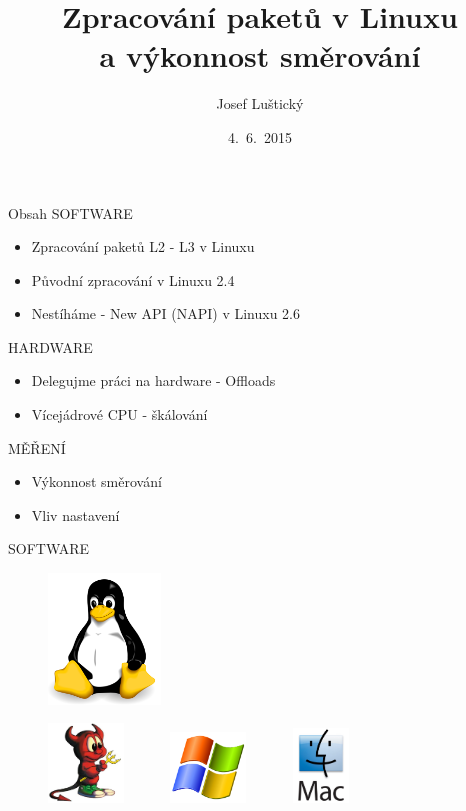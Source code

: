 \documentclass{beamer}
\title{Zpracování paketů v Linuxu\\ a výkonnost směrování}
\author{Josef Luštický}
\institute{FIT VUT Brno}
\date{4.~6.~2015}
\begin{document}
\begin{frame}
  \titlepage
\end{frame}

\expandafter\def\expandafter\insertshorttitle\expandafter{%
  \insertshorttitle\hfill%
  \insertframenumber\,/\,\inserttotalframenumber}

\addtocounter{framenumber}{-1}

\begin{frame}{Obsah}
	SOFTWARE
	\begin{itemize}	
		\item Zpracování paketů L2 - L3 v Linuxu
		\item Původní zpracování v Linuxu 2.4
		\item Nestíháme - New API (NAPI) v Linuxu 2.6
	\end{itemize}
	HARDWARE
	\begin{itemize}
		\item Delegujme práci na hardware - Offloads
		\item Vícejádrové CPU - škálování
	\end{itemize}
	MĚŘENÍ
	\begin{itemize}
		\item Výkonnost směrování
		\item Vliv nastavení
	\end{itemize}
\end{frame}

\begin{frame}{SOFTWARE}
		\begin{figure}
			\centering
			\includegraphics[width=3cm,keepaspectratio]{fig/tux.png}
		\end{figure}
		\begin{figure}
			\centering
			\includegraphics[width=2cm,keepaspectratio]{fig/bestie.jpg}
			~~~~~~\includegraphics[width=2cm,keepaspectratio]{fig/win.jpg}
			~~~~~~\includegraphics[width=1.5cm,keepaspectratio]{fig/mac.jpg}
		\end{figure}
		
\end{frame}
\end{document}
